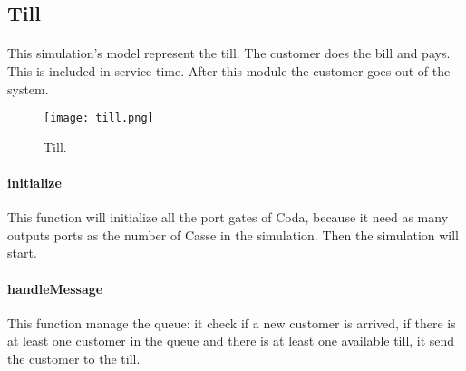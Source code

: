 \subsection{Till}
\paragraph{} This simulation's model represent the till. The customer does the bill and pays. This is included in service time. After this module the customer goes out of the system. 

\begin{figure}[h]
  \begin{center}
  \texttt{[image: till.png]}
  \caption{Till.}
  \label{fig:till}
  \end{center}
\end{figure}

\paragraph{initialize} This function will initialize all the port gates of Coda, because it need as many outputs ports as the number of Casse in the simulation. Then the simulation will start.

\paragraph{handleMessage} This function manage the queue: it check if a new customer is arrived, if there is at least one customer in the queue and there is at least one available till, it send the customer to the till.
